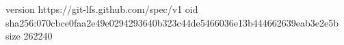 version https://git-lfs.github.com/spec/v1
oid sha256:070cbce0faa2e49e0294293640b323c44de5466036e13b444662639eab3e2e5b
size 262240
